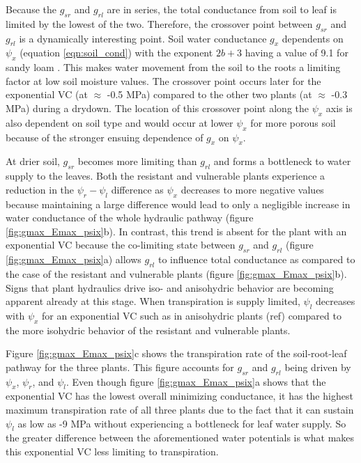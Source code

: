 \documentclass[utf8]{frontiersSCNS} %
\begin{document}
Because the $g_{sr}$ and $g_{rl}$ are in series, the total conductance from soil to leaf is limited by the lowest of the two. Therefore, the crossover point between $g_{sr}$ and $g_{rl}$ is a dynamically interesting point. Soil water conductance $g_x$ dependents on $\psi_x$ (equation \ref{eqn:soil_cond}) with the exponent $2b+3$ having a value of 9.1 for sandy loam \citep{campbell_introduction_2012}. This makes water movement from the soil to the roots a limiting factor at low soil moisture values. The crossover point occurs later for the exponential VC (at $\approx$ -0.5 MPa) compared to the other two plants (at $\approx$ -0.3 MPa) during a drydown. The location of this crossover point along the $\psi_x$ axis is also dependent on soil type and would occur at lower $\psi_x$ for more porous soil because of the stronger ensuing dependence of $g_x$ on $\psi_x$.

At drier soil, $g_{sr}$ becomes more limiting than $g_{rl}$ and forms a bottleneck to water supply to the leaves. Both the resistant and vulnerable plants experience a reduction in the $\psi_r - \psi_l$ difference as $\psi_x$ decreases to more negative values because maintaining a large difference would lead to only a negligible increase in water conductance of the whole hydraulic pathway (figure \ref{fig:gmax_Emax_psix}b). In contrast, this trend is absent for the plant with an exponential VC because the co-limiting state between $g_{sr}$ and $g_{rl}$ (figure \ref{fig:gmax_Emax_psix}a) allows $g_{rl}$ to influence total conductance as compared to the case of the resistant and vulnerable plants (figure \ref{fig:gmax_Emax_psix}b). Signs that plant hydraulics drive iso- and anisohydric behavior are becoming apparent already at this stage. When transpiration is supply limited, $\psi_l$ decreases with $\psi_x$ for an exponential VC such as in anisohydric plants (ref) compared to the more isohydric behavior of the resistant and vulnerable plants.

Figure \ref{fig:gmax_Emax_psix}c shows the transpiration rate of the soil-root-leaf pathway for the three plants. This figure accounts for $g_{sr}$ and $g_{rl}$ being driven by $\psi_x$, $\psi_r$, and $\psi_l$. Even though figure \ref{fig:gmax_Emax_psix}a shows that the exponential VC has the lowest overall minimizing conductance, it has the highest maximum transpiration rate of all three plants due to the fact that it can sustain $\psi_l$ as low as -9 MPa without experiencing a bottleneck for leaf water supply. So the greater difference between the aforementioned water potentials is what makes this exponential VC less limiting to transpiration.
\end{document}
